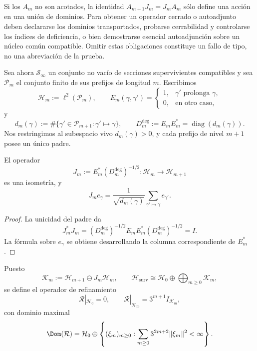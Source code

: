 \begin{remark}
\label{pf84:E03-07}
Si los \(A_m\) no son acotados, la identidad
\(A_{m+1}J_m=J_mA_m\) sólo define una acción en una unión de dominios.
Para obtener un operador cerrado o autoadjunto deben declararse los dominios
transportados, probarse cerrabilidad y controlarse los índices de
deficiencia, o bien demostrarse esencial autoadjunción sobre un núcleo común
compatible. Omitir estas obligaciones constituye un fallo de tipo, no una
abreviación de la prueba.
\end{remark}

Sea ahora \(\mathcal S_\infty\) un conjunto no vacío de secciones
supervivientes compatibles y sea \(\mathcal P_m\) el conjunto finito de sus
prefijos de longitud \(m\). Escribimos
\[
 \mathcal H_m:=\ell^2(\mathcal P_m),
 \qquad
 E_m(\gamma,\gamma')=
 \begin{cases}
 1,&\gamma'\text{ prolonga }\gamma,\\
 0,&\text{en otro caso},
 \end{cases}
\]
y
\[
 d_m(\gamma):=
 \#\{\gamma'\in\mathcal P_{m+1}:\gamma'\mapsto\gamma\},
 \qquad
 D_m^{\deg}:=E_mE_m^*=\operatorname{diag}(d_m(\gamma)).
\]
Nos restringimos al subespacio vivo \(d_m(\gamma)>0\), y cada prefijo de
nivel \(m+1\) posee un único padre.

\begin{theorem}
\label{pf84:C01}
El operador
\[
 J_m:=E_m^*(D_m^{\deg})^{-1/2}:
 \mathcal H_m\longrightarrow\mathcal H_{m+1}
\]
es una isometría, y
\[
 J_me_\gamma=
 \frac1{\sqrt{d_m(\gamma)}}
 \sum_{\gamma'\mapsto\gamma}e_{\gamma'}.
\]
\end{theorem}

\begin{proof}
La unicidad del padre da
\[
 J_m^*J_m
 =(D_m^{\deg})^{-1/2}E_mE_m^*(D_m^{\deg})^{-1/2}=I.
\]
La fórmula sobre \(e_\gamma\) se obtiene desarrollando la columna
correspondiente de \(E_m^*\).
\end{proof}

Puesto
\[
 \mathcal K_m:=\mathcal H_{m+1}\ominus J_m\mathcal H_m,
 \qquad
 \mathcal H_{\mathrm{surv}}
 \cong\mathcal H_0\oplus\bigoplus_{m\ge0}\mathcal K_m,
\]
se define el operador de refinamiento
\[
 \mathcal R|_{\mathcal H_0}=0,
 \qquad
 \mathcal R|_{\mathcal K_m}=3^{m+1}I_{\mathcal K_m},
\]
con dominio maximal
\[
 \Dom(\mathcal R)=
 \mathcal H_0\oplus
 \left\{(\xi_m)_{m\ge0}:
 \sum_{m\ge0}3^{2m+2}\lVert\xi_m\rVert^2<\infty\right\}.
\]

